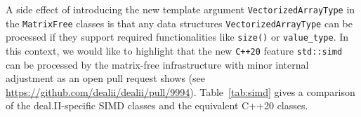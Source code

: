 \documentclass{ansarticle-preprint}
\begin{document}
A side effect of introducing the new template argument \texttt{VectorizedArrayType} 
in the \texttt{MatrixFree} classes is that any data structures 
\texttt{VectorizedArrayType} can be processed if they support required 
functionalities like \texttt{size()} or \texttt{value\_type}. In this context, we 
would like to highlight that the new \texttt{C++20} feature \texttt{std::simd} 
can be processed by the matrix-free infrastructure with minor internal 
adjustment as an open pull request shows 
(see \url{https://github.com/dealii/dealii/pull/9994}).  
Table~\ref{tab:simd} gives a comparison of the deal.II-specific SIMD classes and 
the equivalent C++20 classes. 

\end{document}

